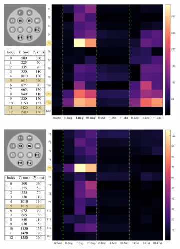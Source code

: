 \begin{figure}[ht]
    \centering
    \begin{subfigure}[b]{.9\textwidth}
        \includegraphics[width=\textwidth]{images/mrf/T1GTMinusT1SimuAbsoluteDifference}
        \label{fig:T1GTMinusT1SimuAbsoluteDifference}
    \end{subfigure}
    
    \begin{subfigure}[b]{.9\textwidth}
        \includegraphics[width=\textwidth]{images/mrf/T2GTMinusT2SimuAbsoluteDifference}
        \label{fig:T2GTMinusT2SimuAbsoluteDifference}
    \end{subfigure}
    

\end{figure}
